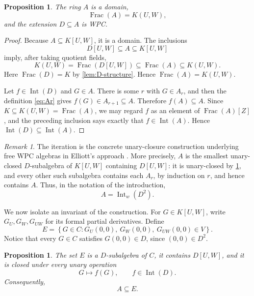 \documentclass[11pt,reqno]{amsart}
\numberwithin{equation}{section}
\theoremstyle{plain}
\newtheorem{proposition}[theorem]{Proposition}
\theoremstyle{definition}
\theoremstyle{remark}
\newtheorem{remark}[theorem]{Remark}
\newcommand{\Int}{\operatorname{Int}}
\newcommand{\Frac}{\operatorname{Frac}}
\begin{document}
\begin{proposition}\label{prop:WPC}
The ring \(A\) is a domain,
\[
 \Frac(A)=K(U,W),
\]
and the extension \(D\subseteq A\) is WPC.
\end{proposition}

\begin{proof}
Because \(A\subseteq K[U,W]\), it is a domain.  The inclusions
\[
 D[U,W]\subseteq A\subseteq K[U,W]
\]
imply, after taking quotient fields,
\[
 K(U,W)=\Frac(D[U,W])
 \subseteq\Frac(A)\subseteq K(U,W).
\]
Here \(\Frac(D)=K\) by \cref{lem:D-structure}.  Hence
\(\Frac(A)=K(U,W)\).

Let \(f\in\Int(D)\) and \(G\in A\).  There is some \(r\) with
\(G\in A_r\), and then the definition \eqref{eq:Ar} gives
\(f(G)\in A_{r+1}\subseteq A\).  Therefore \(f(A)\subseteq A\).
Since \(K\subseteq K(U,W)=\Frac(A)\), we may regard \(f\) as an
element of \(\Frac(A)[Z]\), and the preceding inclusion says exactly
that \(f\in\Int(A)\).  Hence
\(\Int(D)\subseteq\Int(A)\).
\end{proof}

\begin{remark}\label{rem:free}
The iteration is the concrete unary-closure construction underlying
free WPC algebras in Elliott's approach
\cite{Elliott2009,Elliott2010}.  More precisely, \(A\) is the smallest
unary-closed \(D\)-subalgebra of \(K[U,W]\) containing \(D[U,W]\):
it is unary-closed by \cref{prop:WPC}, and every other such subalgebra
contains each \(A_r\), by induction on \(r\), and hence contains \(A\).
Thus, in the notation of the introduction,
\[
 A=\Int_w(D^2).
\]
\end{remark}

We now isolate an invariant of the construction.  For
\(G\in K[U,W]\), write \(G_U,G_W,G_{UW}\) for its formal partial
derivatives.  Define
\begin{equation}
 E=\left\{
 G\in C:
 G_U(0,0),\ G_W(0,0),\ G_{UW}(0,0)\in V
 \right\}.
 \label{eq:E}
\end{equation}
Notice that every \(G\in C\) satisfies \(G(0,0)\in D\), since
\((0,0)\in D^2\).

\begin{proposition}\label{prop:invariant}
The set \(E\) is a \(D\)-subalgebra of \(C\), it contains
\(D[U,W]\), and it is closed under every unary operation
\[
 G\longmapsto f(G),\qquad f\in\Int(D).
\]
Consequently,
\[
 A\subseteq E.
\]
\end{proposition}
\end{document}
